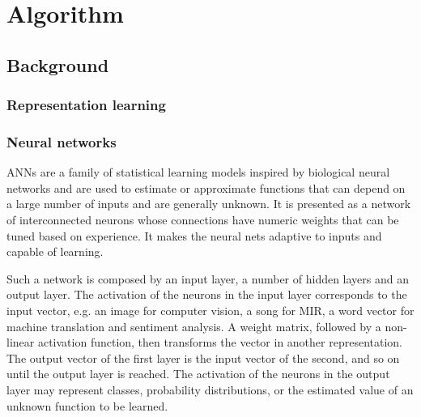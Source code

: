 \part{Algorithm} \label{part:algorithm}

\chapter{Background} \label{chap:background}

\section{Representation learning}

\section{Neural networks}

\gls{ANNs} are a family of statistical learning models inspired by biological neural networks and are used to estimate or approximate functions that can depend on a large number of inputs and are generally unknown. It is presented as a network of interconnected neurons whose connections have numeric weights that can be tuned based on experience. It makes the neural nets adaptive to inputs and capable of learning.

Such a network is composed by an input layer, a number of hidden layers and an output layer. The activation of the neurons in the input layer corresponds to the input vector, e.g. an image for computer vision, a song for \gls{MIR}, a word vector for machine translation and sentiment analysis. A weight matrix, followed by a non-linear activation function, then transforms the vector in another representation. The output vector of the first layer is the input vector of the second, and so on until the output layer is reached. The activation of the neurons in the output layer may represent classes, probability distributions, or the estimated value of an unknown function to be learned.

